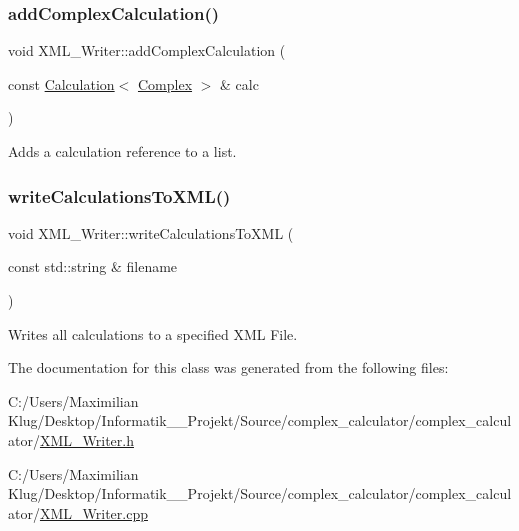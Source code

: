 \subsubsection{\texorpdfstring{add\+Complex\+Calculation()}{addComplexCalculation()}}
{\footnotesize\ttfamily void X\+M\+L\+\_\+\+Writer\+::add\+Complex\+Calculation (\begin{DoxyParamCaption}\item[{const \mbox{\hyperlink{class_calculation}{Calculation}}$<$ \mbox{\hyperlink{class_complex}{Complex}} $>$ \&}]{calc }\end{DoxyParamCaption})}



Adds a calculation reference to a list. 

\mbox{\label{class_x_m_l___writer_a69eba4821f47637350804b7af1be5928}} 
\subsubsection{\texorpdfstring{write\+Calculations\+To\+X\+M\+L()}{writeCalculationsToXML()}}
{\footnotesize\ttfamily void X\+M\+L\+\_\+\+Writer\+::write\+Calculations\+To\+X\+ML (\begin{DoxyParamCaption}\item[{const std\+::string \&}]{filename }\end{DoxyParamCaption})}



Writes all calculations to a specified X\+ML File. 



The documentation for this class was generated from the following files\+:\begin{DoxyCompactItemize}
\item 
C\+:/\+Users/\+Maximilian Klug/\+Desktop/\+Informatik\+\_\+\_\+\+Projekt/\+Source/complex\+\_\+calculator/complex\+\_\+calculator/\mbox{\hyperlink{_x_m_l___writer_8h}{X\+M\+L\+\_\+\+Writer.\+h}}\item 
C\+:/\+Users/\+Maximilian Klug/\+Desktop/\+Informatik\+\_\+\_\+\+Projekt/\+Source/complex\+\_\+calculator/complex\+\_\+calculator/\mbox{\hyperlink{_x_m_l___writer_8cpp}{X\+M\+L\+\_\+\+Writer.\+cpp}}\end{DoxyCompactItemize}

